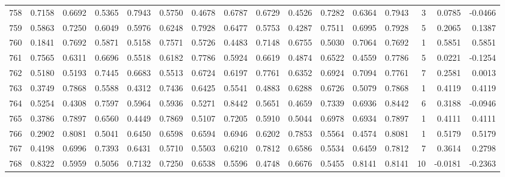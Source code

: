 \begin{tabular}{lrrrrrrrrrrrrrrr}
758 &      0.7158 &  0.6692 &  0.5365 &  0.7943 &  0.5750 &  0.4678 &  0.6787 &  0.6729 &  0.4526 &  0.7282 &   0.6364 &     0.7943 &      3 &                    0.0785 &                    -0.0466 \\
759 &      0.5863 &  0.7250 &  0.6049 &  0.5976 &  0.6248 &  0.7928 &  0.6477 &  0.5753 &  0.4287 &  0.7511 &   0.6995 &     0.7928 &      5 &                    0.2065 &                     0.1387 \\
760 &      0.1841 &  0.7692 &  0.5871 &  0.5158 &  0.7571 &  0.5726 &  0.4483 &  0.7148 &  0.6755 &  0.5030 &   0.7064 &     0.7692 &      1 &                    0.5851 &                     0.5851 \\
761 &      0.7565 &  0.6311 &  0.6696 &  0.5518 &  0.6182 &  0.7786 &  0.5924 &  0.6619 &  0.4874 &  0.6522 &   0.4559 &     0.7786 &      5 &                    0.0221 &                    -0.1254 \\
762 &      0.5180 &  0.5193 &  0.7445 &  0.6683 &  0.5513 &  0.6724 &  0.6197 &  0.7761 &  0.6352 &  0.6924 &   0.7094 &     0.7761 &      7 &                    0.2581 &                     0.0013 \\
763 &      0.3749 &  0.7868 &  0.5588 &  0.4312 &  0.7436 &  0.6425 &  0.5541 &  0.4883 &  0.6288 &  0.6726 &   0.5079 &     0.7868 &      1 &                    0.4119 &                     0.4119 \\
764 &      0.5254 &  0.4308 &  0.7597 &  0.5964 &  0.5936 &  0.5271 &  0.8442 &  0.5651 &  0.4659 &  0.7339 &   0.6936 &     0.8442 &      6 &                    0.3188 &                    -0.0946 \\
765 &      0.3786 &  0.7897 &  0.6560 &  0.4449 &  0.7869 &  0.5107 &  0.7205 &  0.5910 &  0.5044 &  0.6978 &   0.6934 &     0.7897 &      1 &                    0.4111 &                     0.4111 \\
766 &      0.2902 &  0.8081 &  0.5041 &  0.6450 &  0.6598 &  0.6594 &  0.6946 &  0.6202 &  0.7853 &  0.5564 &   0.4574 &     0.8081 &      1 &                    0.5179 &                     0.5179 \\
767 &      0.4198 &  0.6996 &  0.7393 &  0.6431 &  0.5710 &  0.5503 &  0.6210 &  0.7812 &  0.6586 &  0.5534 &   0.6459 &     0.7812 &      7 &                    0.3614 &                     0.2798 \\
768 &      0.8322 &  0.5959 &  0.5056 &  0.7132 &  0.7250 &  0.6538 &  0.5596 &  0.4748 &  0.6676 &  0.5455 &   0.8141 &     0.8141 &     10 &                   -0.0181 &                    -0.2363 \\

\end{tabular}
